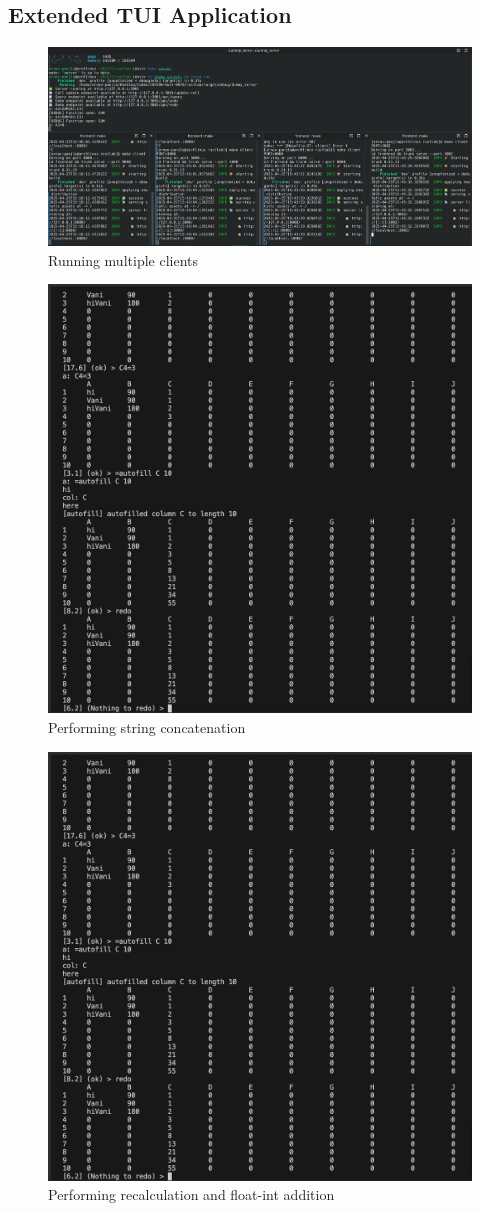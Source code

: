 \subsection{Extended TUI Application}

        \begin{figure}[H]
            \centering
            \includegraphics[width=0.75\linewidth]{figures/runnning_multiple_clients.png}
            \caption{Running multiple clients}
            \label{fig:enter-label}
        \end{figure}

        \begin{figure}[H]
            \centering
            \includegraphics[width=0.5\linewidth]{image.png}
            \caption{Performing string concatenation}
            \label{fig:enter-label}
        \end{figure}

        \begin{figure}[H]
            \centering
            \includegraphics[width=0.5\linewidth]{image.png}
            \caption{Performing recalculation and float-int addition}
            \label{fig:enter-label}
        \end{figure}
        
